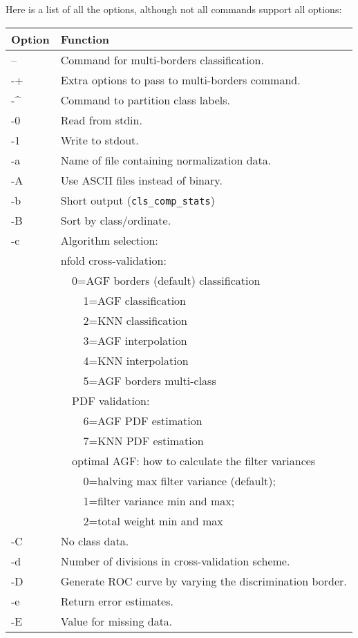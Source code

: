 \documentclass[12pt]{article}
\begin{document}
Here is a list of all the options, although not all commands support all options:

\begin{tabular}{ll}
Option & Function \\
\hline
-- & Command for multi-borders classification.\\
-+ & Extra options to pass to multi-borders command.\\
-\^ & Command to partition class labels.\\
-0 & Read from stdin.\\
-1 & Write to stdout.\\
-a & Name of file containing normalization data.\\
-A & Use ASCII files instead of binary.\\
-b & Short output (\verb/cls_comp_stats/)\\
-B & Sort by class/ordinate.\\
-c & Algorithm selection:\\
& nfold cross-validation:\\
& \verb/  /0=AGF borders (default) classification\\
& \verb/    /1=AGF classification\\
& \verb/    /2=KNN classification\\
& \verb/    /3=AGF interpolation\\
& \verb/    /4=KNN interpolation\\
& \verb/    /5=AGF borders multi-class\\
& \verb/  /PDF validation:\\
& \verb/    /6=AGF PDF estimation\\
& \verb/    /7=KNN PDF estimation\\
& \verb/  /optimal AGF: how to calculate the filter variances\\
& \verb/    /0=halving max filter variance (default);\\
& \verb/    /1=filter variance min and max;\\
& \verb/    /2=total weight min and max\\
-C & No class data.\\
-d & Number of divisions in cross-validation scheme.\\
-D & Generate ROC curve by varying the discrimination border.\\
-e & Return error estimates.\\
-E & Value for missing data.
\end{tabular}
\end{document}
